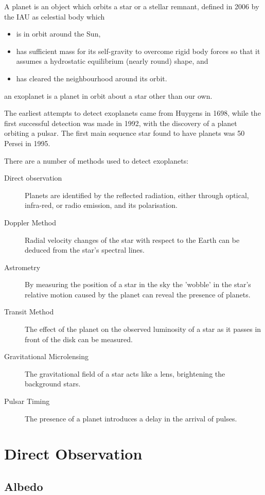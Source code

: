 A planet is an object which orbits a star or a stellar remnant,
defined in 2006 by the IAU as celestial body which
\begin{itemize}
\item is in orbit around the Sun,
\item has sufficient mass for its self-gravity to overcome rigid body
  forces so that it assumes a hydrostatic equilibrium (nearly round)
  shape, and
\item has cleared the neighbourhood around its orbit.
\end{itemize}
an exoplanet is a planet in orbit about a star other than our own.

The earliest attempts to detect exoplanets came from Huygens in 1698,
while the first successful detection was made in 1992, with the
discovery of a planet orbiting a pulsar. The first main sequence star
found to have planets was 50 Persei in 1995.

There are a number of methods used to detect exoplanets:

\begin{description}
\item[Direct observation] Planets are identified by the reflected
  radiation, either through optical, infra-red, or radio emission, and
  its polarisation.
\item[Doppler Method] Radial velocity changes of the star with respect
  to the Earth can be deduced from the star's spectral lines.
\item[Astrometry] By measuring the position of a star in the sky the
  'wobble' in the star's relative motion caused by the planet can
  reveal the presence of planets.
\item[Transit Method] The effect of the planet on the observed
  luminosity of a star as it passes in front of the disk can be
  measured.
\item[Gravitational Microlensing] The gravitational field of a star
  acts like a lens, brightening the background stars.
\item[Pulsar Timing] The presence of a planet introduces a delay in
  the arrival of pulses.
\end{description}

\section{Direct Observation}
\label{sec:direct-observation}

\subsection{Albedo}
\label{sec:albedo}


